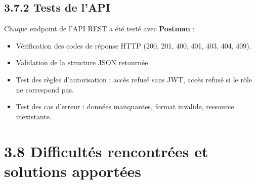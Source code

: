 \documentclass[12pt,a4paper]{report}
\begin{document}
\subsection*{3.7.2 Tests de l'API}

Chaque endpoint de l'API REST a \'et\'e test\'e avec \textbf{Postman} :

\begin{itemize}
    \item V\'erification des codes de r\'eponse HTTP (200, 201, 400, 401, 403, 404, 409).
    \item Validation de la structure JSON retourn\'ee.
    \item Test des r\`egles d'autorisation : acc\`es refus\'e sans JWT, acc\`es refus\'e si le r\^ole ne correspond pas.
    \item Test des cas d'erreur : donn\'ees manquantes, format invalide, ressource inexistante.
\end{itemize}

\newpage

\section*{3.8 Difficult\'es rencontr\'ees et solutions apport\'ees}
\end{document}
